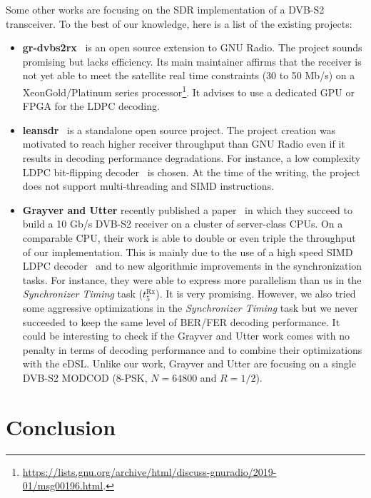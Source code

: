 Some other works are focusing on the SDR implementation of a DVB-S2 transceiver.
To the best of our knowledge, here is a list of the existing projects:
\begin{itemize}
  \item \textbf{gr-dvbs2rx}~\cite{gr-dvbs2rx} is an open source extension to GNU
    Radio. The project sounds promising but lacks efficiency. Its main
    maintainer affirms that the receiver is not yet able to meet the satellite
    real time constraints (30 to 50 Mb/s) on a Xeon\TM Gold/Platinum series
    processor\footnote{\url{https://lists.gnu.org/archive/html/discuss-gnuradio/2019-01/msg00196.html}.}.
    It advises to use a dedicated GPU or FPGA for the LDPC decoding.
  \item \textbf{leansdr}~\cite{leansdr} is a standalone open source project. The
    project creation was motivated to reach higher receiver throughput than GNU
    Radio even if it results in decoding performance degradations. For instance,
    a low complexity LDPC bit-flipping decoder~\cite{Ryan2009} is chosen. At the
    time of the writing, the project does not support multi-threading and SIMD
    instructions.
  \item \textbf{Grayver and Utter} recently published a paper~\cite{Grayver2020}
    in which they succeed to build a 10 Gb/s DVB-S2 receiver on a cluster of
    server-class CPUs. On a comparable CPU, their work is able to double or even
    triple the throughput of our implementation. This is mainly due to the use
    of a high speed SIMD LDPC decoder~\cite{LeGal2016,Grayver2019} and to new
    algorithmic improvements in the synchronization tasks. For instance, they
    were able to express more parallelism than us in the \emph{Synchronizer
    Timing} task ($t^\text{Rx}_{5}$). It is very promising. However, we also
    tried some aggressive optimizations in the \emph{Synchronizer Timing} task
    but we never succeeded to keep the same level of BER/FER decoding
    performance. It could be interesting to check if the Grayver and Utter work
    comes with no penalty in terms of decoding performance and to combine their
    optimizations with the \AFFECT eDSL. Unlike our work, Grayver and Utter are
    focusing on a single DVB-S2 MODCOD (8-PSK, $N = 64800$ and $R = 1/2$).
\end{itemize}

\section{Conclusion}

